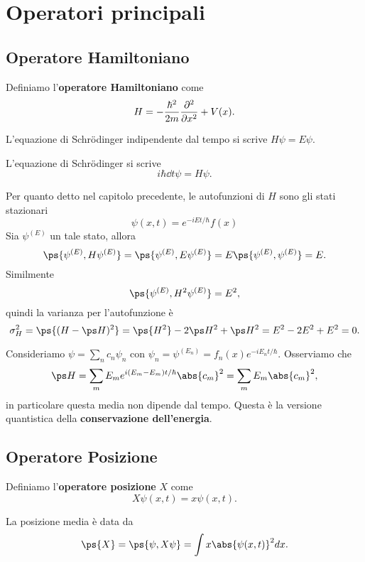 \section{Operatori principali}

\subsection{Operatore Hamiltoniano}
\begin{definition}
Definiamo l'\textbf{operatore Hamiltoniano} come
\[H=-\frac{\hbar^2}{2m}\pps[2]x{}+V(x).\]
\end{definition}
\begin{remark}
L'equazione di Schr\"odinger indipendente dal tempo si scrive $H\psi=E\psi$.
\end{remark}

\begin{remark}
L'equazione di Schr\"odinger si scrive
\[i\hbar\dd t\psi=H\psi.\]
\end{remark}

\noindent Per quanto detto nel capitolo precedente, le autofunzioni di $H$ sono gli stati stazionari
\[\psi(x,t)=e^{-iEt/\hbar} f(x)\]
Sia $\psi^{(E)}$ un tale stato, allora
\[\ps{\psi^{(E)},H\psi^{(E)}}=\ps{\psi^{(E)},E\psi^{(E)}}=E\ps{\psi^{(E)},\psi^{(E)}}=E.\]
Similmente
\[\ps{\psi^{(E)},H^2\psi^{(E)}}=E^2,\]
quindi la varianza per l'autofunzione \`e
\[\sigma_H^2=\ps{(H-\ps H)^2}=\ps{H^2}-2\ps H^2+\ps H^2=E^2-2E^2+E^2=0.\]

\begin{remark}
Consideriamo $\psi=\sum_n c_n\psi_n$ con $\psi_n=\psi^{(E_n)}=f_n(x)e^{-iE_nt/\hbar}$. Osserviamo che 
\[\ps H=\sum_m E_me^{i(E_m-E_m) t/\hbar}\abs{c_m}^2=\sum_m E_m\abs{c_m}^2,\]
in particolare questa media non dipende dal tempo. Questa \`e la versione quantistica della \textbf{conservazione dell'energia}.
\end{remark}


\subsection{Operatore Posizione}

\begin{definition}
Definiamo l'\textbf{operatore posizione} $X$ come
\[X\psi(x,t)=x\psi(x,t).\]
\end{definition}

\begin{remark}
La posizione media \`e data da
\[\ps{X}=\ps{\psi,X\psi}=\int x\abs{\psi(x,t)}^2dx.\]
\end{remark}

